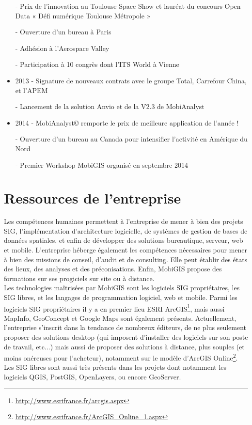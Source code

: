 \begin{itemize}
		- Prix de l'innovation au Toulouse Space Show et lauréat du concours Open Data « Défi numérique Toulouse Métropole » 
    
		- Ouverture d'un bureau à Paris 
    
		- Adhésion à l'Aerospace Valley 
    
		- Participation à 10 congrès dont l'ITS World à Vienne 
\\
\item 2013 
    - Signature de nouveaux contrats avec le groupe Total, Carrefour China, et l'APEM 
    
		- Lancement de la solution Anvio et de la V2.3 de MobiAnalyst 
\\
\item 2014
    - MobiAnalyst© remporte le prix de meilleure application de l'année !
    
		- Ouverture d'un bureau au Canada pour intensifier l'activité en Amérique du Nord
    
		- Premier Workshop MobiGIS organisé en septembre 2014 

\end{itemize}



\section{Ressources de l'entreprise}

Les compétences humaines permettent à l'entreprise de mener à bien des projets SIG, l'implémentation d'architecture logicielle, de systèmes de gestion de bases de données spatiales, et enfin de développer des solutions bureautique, serveur, web et mobile. 
L'entreprise héberge également les compétences nécessaires pour mener à bien des missions de conseil, d'audit et de consulting. Elle peut établir des états des lieux, des analyses et des préconisations. Enfin, MobiGIS propose des formations sur ses progiciels sur site ou à distance. \\

Les technologies maîtrisées par MobiGIS sont les logiciels SIG propriétaires, les SIG libres, et les langages de programmation logiciel, web et mobile. Parmi les logiciels SIG propriétaires il y a en premier lieu ESRI ArcGIS\footnote{\url{http://www.esrifrance.fr/arcgis.aspx}}, mais aussi MapInfo, GeoConcept et Google Maps sont également présents. Actuellement, l'entreprise s'inscrit dans la tendance de nombreux éditeurs, de ne plus seulement proposer des solutions desktop (qui imposent d'installer des logiciels sur son poste de travail, etc...) mais aussi de proposer des solutions à distance, plus souples (et moins onéreuses pour l'acheteur), notamment sur le modèle d'ArcGIS Online\footnote{\url{http://www.esrifrance.fr/ArcGIS_Online_1.aspx}}. Les SIG libres sont aussi très présents dans les projets dont notamment les logiciels QGIS, PostGIS, OpenLayers, ou encore GeoServer. \\

